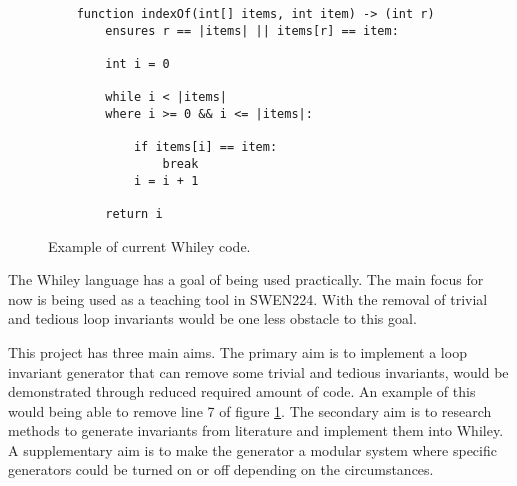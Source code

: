 \documentclass[11pt, a4paper, twoside, openright]{report}
\begin{document}
\begin{figure}[h]
    \begin{lstlisting}
    function indexOf(int[] items, int item) -> (int r)
        ensures r == |items| || items[r] == item:

        int i = 0

        while i < |items|
        where i >= 0 && i <= |items|:

            if items[i] == item:
                break
            i = i + 1

        return i
    \end{lstlisting}
    \caption{Example of current Whiley code.}
    \label{fig:whiley-ex-1}
\end{figure}


The Whiley language has a goal of being used practically.
The main focus for now is being used as a teaching tool in SWEN224.
With the removal of trivial and tedious loop invariants would be one 
less obstacle to this goal.


This project has three main aims.
The primary aim is to implement a loop invariant generator that can remove
some trivial and tedious invariants, would be demonstrated through reduced required
amount of code. An example of this would being able to remove line 7 of figure
\ref{fig:whiley-ex-1}.
The secondary aim is to research methods to generate invariants from literature 
and implement them into Whiley.
A supplementary aim is to make the generator a modular system where specific generators
could be turned on or off depending on the circumstances.
\end{document}
